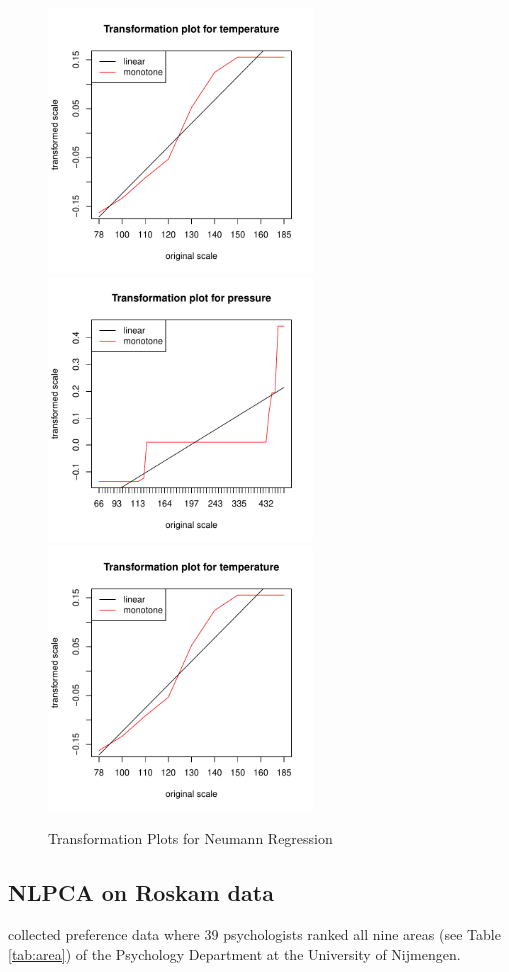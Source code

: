 \documentclass[article, nojss]{jss}
\begin{document}
\begin{figure}[hbt]
\begin{center}
\includegraphics[height=70mm, width=70mm]{neutrftemp.pdf}
\includegraphics[height=70mm, width=70mm]{neutrfpres.pdf}
\includegraphics[height=70mm, width=70mm]{neutrfdens.pdf}
\caption{\label{fig:neutrf}Transformation Plots for Neumann Regression}
\end{center}
\end{figure}

\subsection{NLPCA on Roskam data}
\label{sec:pcex}
\citet{Roskam:68} collected preference data where 39 psychologists ranked all nine areas (see Table \ref{tab:area}) of the Psychology Department at the University of Nijmengen. 
\end{document}
